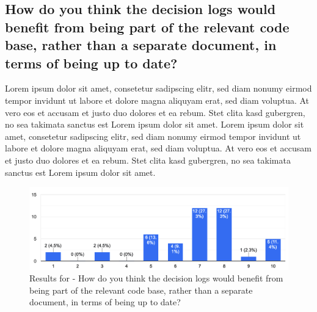 \subsection{How do you think the decision logs would benefit from being part of the relevant code base, rather than a separate document, in terms of being up to date?}
Lorem ipsum dolor sit amet, consetetur sadipscing elitr, sed diam nonumy eirmod tempor invidunt ut labore et dolore magna aliquyam erat, sed diam voluptua. At vero eos et accusam et justo duo dolores et ea rebum. Stet clita kasd gubergren, no sea takimata sanctus est Lorem ipsum dolor sit amet. Lorem ipsum dolor sit amet, consetetur sadipscing elitr, sed diam nonumy eirmod tempor invidunt ut labore et dolore magna aliquyam erat, sed diam voluptua. At vero eos et accusam et justo duo dolores et ea rebum. Stet clita kasd gubergren, no sea takimata sanctus est Lorem ipsum dolor sit amet.
\begin{figure}[h!]
\centering
\includegraphics[width=\linewidth]{Images/Survey/decisions_3.png}
\caption{Results for - How do you think the decision logs would benefit from being part of the relevant code base, rather than a separate document, in terms of being up to date?}
\label{fig:results:decisions:3}
\end{figure}

